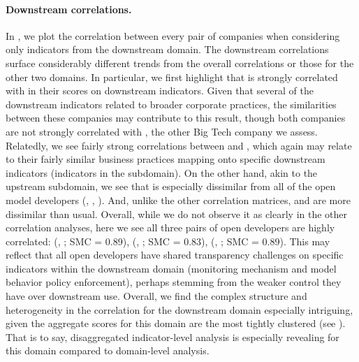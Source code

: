 \paragraph{Downstream correlations.}
In , we plot the correlation between every pair of companies when considering only indicators from the downstream domain.
The downstream correlations surface considerably different trends from the overall correlations or those for the other two domains.
In particular, we first highlight that \meta is strongly correlated with \google in their scores on downstream indicators.
Given that several of the downstream indicators related to broader corporate practices, the similarities between these companies may contribute to this result, though both companies are not strongly correlated with \amazon, the other Big Tech company we assess.
Relatedly, we see fairly strong correlations between \openai and \anthropic, which again may relate to their fairly similar business practices mapping onto specific downstream indicators (\eg indicators in the \modelbehaviorpolicy subdomain).
On the other hand, akin to the upstream subdomain, we see that \inflection is especially dissimilar from all of the open model developers (\meta, \huggingface, \stability). 
And, unlike the other correlation matrices, \openai and \amazon are more dissimilar than usual. 
Overall, while we do not observe it as clearly in the other correlation analyses, here we see all three pairs of open developers are highly correlated:
(\meta, \huggingface; SMC = 0.89),
(\meta, \stability; SMC = 0.83),
(\huggingface, \stability; SMC = 0.89).
This may reflect that all open developers have shared transparency challenges on specific indicators within the downstream domain (\eg monitoring mechanism and model behavior policy enforcement), perhaps stemming from the weaker control they have over downstream use. 
Overall, we find the complex structure and heterogeneity in the correlation for the downstream domain especially intriguing, given the aggregate scores for this domain are the most tightly clustered (see ).
That is to say, disaggregated indicator-level analysis is especially revealing for this domain compared to domain-level analysis.
